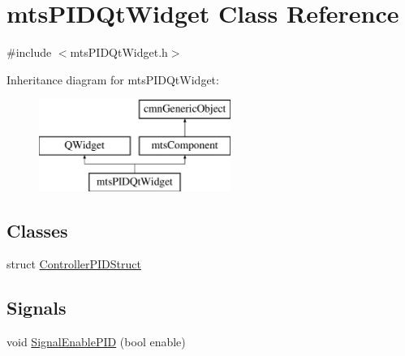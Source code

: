 \hypertarget{classmts_p_i_d_qt_widget}{\section{mts\-P\-I\-D\-Qt\-Widget Class Reference}
\label{classmts_p_i_d_qt_widget}
}


{\ttfamily \#include $<$mts\-P\-I\-D\-Qt\-Widget.\-h$>$}

Inheritance diagram for mts\-P\-I\-D\-Qt\-Widget\-:\begin{figure}[H]
\begin{center}
\leavevmode
\includegraphics[height=3.000000cm]{d6/de2/classmts_p_i_d_qt_widget}
\end{center}
\end{figure}
\subsection*{Classes}
\begin{DoxyCompactItemize}
\item 
struct \hyperlink{structmts_p_i_d_qt_widget_1_1_controller_p_i_d_struct}{Controller\-P\-I\-D\-Struct}
\end{DoxyCompactItemize}
\subsection*{Signals}
\begin{DoxyCompactItemize}
\item 
void \hyperlink{classmts_p_i_d_qt_widget_ad9810d6f7a836bebaa16e874c7e9594f}{Signal\-Enable\-P\-I\-D} (bool enable)
\end{DoxyCompactItemize}
